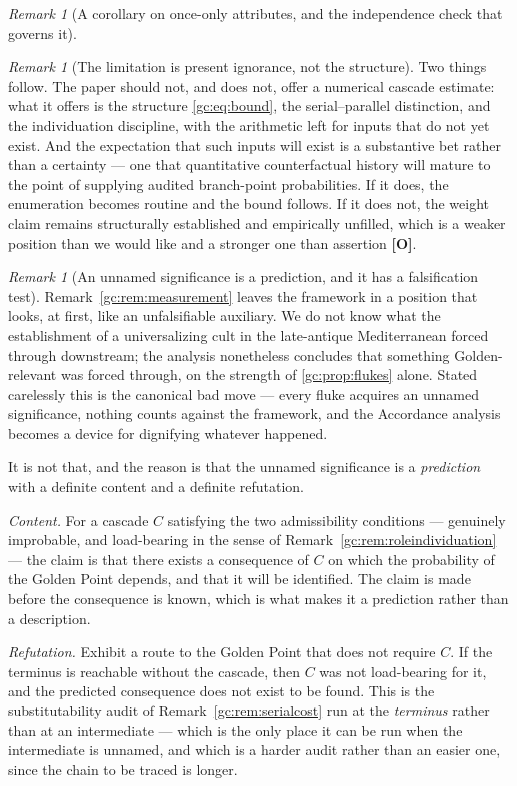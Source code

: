 \documentclass[11pt]{article}
\numberwithin{equation}{section}
\theoremstyle{plain}
\theoremstyle{definition}
\theoremstyle{remark}
\newtheorem{remark}[theorem]{Remark}
\begin{document}
\begin{remark}[A corollary on once-only attributes, and the independence
check that governs it]
\begin{remark}[The limitation is present ignorance, not the structure]
Two things follow. The paper should not, and does not, offer a numerical
cascade estimate: what it offers is the structure
\eqref{gc:eq:bound}, the serial--parallel distinction, and the
individuation discipline, with the arithmetic left for inputs that do
not yet exist. And the expectation that such inputs will exist is a
substantive bet rather than a certainty --- one that quantitative
counterfactual history will mature to the point of supplying audited
branch-point probabilities. If it does, the enumeration becomes
routine and the bound follows. If it does not, the weight claim remains
structurally established and empirically unfilled, which is a weaker
position than we would like and a stronger one than assertion
\textbf{[O]}.
\end{remark}

\begin{remark}[An unnamed significance is a prediction, and it has a
falsification test]\label{gc:rem:unnamed}
Remark~\ref{gc:rem:measurement} leaves the framework in a position that
looks, at first, like an unfalsifiable auxiliary. We do not know what
the establishment of a universalizing cult in the late-antique
Mediterranean forced through downstream; the analysis nonetheless
concludes that something Golden-relevant was forced through, on the
strength of \ref{gc:prop:flukes} alone. Stated carelessly this is the
canonical bad move --- every fluke acquires an unnamed significance,
nothing counts against the framework, and the Accordance analysis
becomes a device for dignifying whatever happened.

It is not that, and the reason is that the unnamed significance is a
\emph{prediction} with a definite content and a definite refutation.

\emph{Content.} For a cascade $C$ satisfying the two admissibility
conditions --- genuinely improbable, and load-bearing in the sense of
Remark~\ref{gc:rem:roleindividuation} --- the claim is that there exists
a consequence of $C$ on which the probability of the Golden Point
depends, and that it will be identified. The claim is made before the
consequence is known, which is what makes it a prediction rather than a
description.

\emph{Refutation.} Exhibit a route to the Golden Point that does not
require $C$. If the terminus is reachable without the cascade, then
$C$ was not load-bearing for it, and the predicted consequence does not
exist to be found. This is the substitutability audit of
Remark~\ref{gc:rem:serialcost} run at the \emph{terminus} rather than at
an intermediate --- which is the only place it can be run when the
intermediate is unnamed, and which is a harder audit rather than an
easier one, since the chain to be traced is longer.


\end{remark}
\end{remark}
\end{document}
